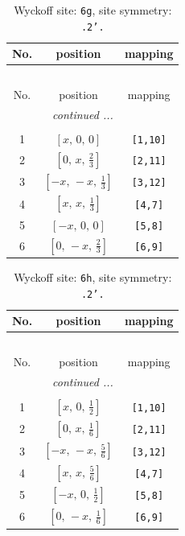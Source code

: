 \documentclass[fleqn,8pt]{jsarticle}
\begin{document}
\renewcommand{\arraystretch}{1.2}
\begin{longtable}{ccc}
\caption{Wyckoff site: {\tt 6g}, site symmetry: {\tt .2'.}}
 \\
 \hline \hline
No. & position & mapping \\ \hline \endfirsthead

\multicolumn{2}{l}{\tablename\ \thetable{}} \\
 \hline \hline
No. & position & mapping \\ \hline \endhead

 \hline \hline
\multicolumn{2}{r}{\footnotesize\it continued ...} \\ \endfoot

 \hline \hline
\multicolumn{2}{r}{} \\ \endlastfoot

1 & $\left[ x,\, 0,\, 0 \right]$ & {\tt [1,10]} \\ \hline
2 & $\left[ 0,\, x,\, \frac{2}{3} \right]$ & {\tt [2,11]} \\ \hline
3 & $\left[ - x,\, - x,\, \frac{1}{3} \right]$ & {\tt [3,12]} \\ \hline
4 & $\left[ x,\, x,\, \frac{1}{3} \right]$ & {\tt [4,7]} \\ \hline
5 & $\left[ - x,\, 0,\, 0 \right]$ & {\tt [5,8]} \\ \hline
6 & $\left[ 0,\, - x,\, \frac{2}{3} \right]$ & {\tt [6,9]} \\
\end{longtable}
\renewcommand{\arraystretch}{1.2}
\begin{longtable}{ccc}
\caption{Wyckoff site: {\tt 6h}, site symmetry: {\tt .2'.}}
 \\
 \hline \hline
No. & position & mapping \\ \hline \endfirsthead

\multicolumn{2}{l}{\tablename\ \thetable{}} \\
 \hline \hline
No. & position & mapping \\ \hline \endhead

 \hline \hline
\multicolumn{2}{r}{\footnotesize\it continued ...} \\ \endfoot

 \hline \hline
\multicolumn{2}{r}{} \\ \endlastfoot

1 & $\left[ x,\, 0,\, \frac{1}{2} \right]$ & {\tt [1,10]} \\ \hline
2 & $\left[ 0,\, x,\, \frac{1}{6} \right]$ & {\tt [2,11]} \\ \hline
3 & $\left[ - x,\, - x,\, \frac{5}{6} \right]$ & {\tt [3,12]} \\ \hline
4 & $\left[ x,\, x,\, \frac{5}{6} \right]$ & {\tt [4,7]} \\ \hline
5 & $\left[ - x,\, 0,\, \frac{1}{2} \right]$ & {\tt [5,8]} \\ \hline
6 & $\left[ 0,\, - x,\, \frac{1}{6} \right]$ & {\tt [6,9]} \\
\end{longtable}
\end{document}
